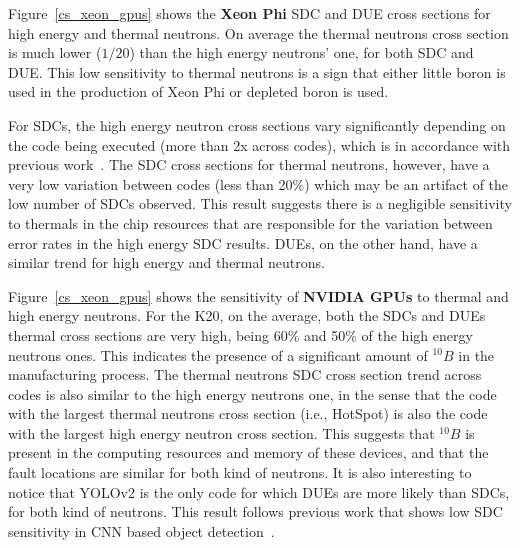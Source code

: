 Figure~\ref{cs_xeon_gpus} shows the \textbf{Xeon Phi} SDC and DUE cross sections for high energy and thermal neutrons. On  average the thermal neutrons cross section is much lower ($1/20$) than the high energy neutrons' one, for both SDC and DUE.
This low sensitivity to thermal neutrons is a sign that either little boron is used in the production of Xeon Phi or depleted boron is used.


For SDCs, the high energy neutron cross sections vary significantly depending on the code being executed (more than 2x across codes), which is in accordance with previous work~\cite{sc2017, fratin2018DSN}. The SDC cross sections for thermal neutrons, however, have a very low variation between codes (less than 20\%) which may be an artifact of the low number of SDCs observed. This result suggests there is a negligible sensitivity to thermals in the  chip resources that are responsible for the variation between error rates in the high energy SDC results.
DUEs, on the other hand, have a similar trend for high energy and thermal neutrons. %

Figure~\ref{cs_xeon_gpus} shows the sensitivity of \textbf{NVIDIA GPUs} to thermal and high energy neutrons.
For the K20, on the average, both the SDCs and DUEs thermal cross sections are very high, being 60\% and 50\% of the high energy neutrons ones. This indicates the presence of a significant amount of $^{10}B$ in the manufacturing process. The thermal neutrons SDC cross section trend across codes is also similar to the high energy neutrons one, in the sense that the code with the largest thermal neutrons cross section (i.e., HotSpot) is also the code with the largest high energy neutron cross section. This suggests that $^{10}B$ is present in the computing resources and memory of these devices, and that the fault locations are similar for both kind of neutrons. 
%
It is also interesting to notice that YOLOv2 is the only code for which DUEs are more likely than SDCs, for both kind of neutrons. This result follows previous work that shows low SDC sensitivity in CNN based object detection~\cite{ffsantos2018}. %

